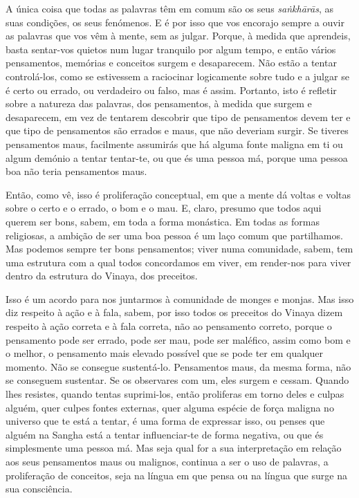 A única coisa que todas as palavras têm em comum são os seus \emph{saṅkhārās}, as suas
condições, os seus fenómenos. E é por isso que vos encorajo sempre a ouvir as
palavras que vos vêm à mente, sem as julgar. Porque, à medida que aprendeis,
basta sentar-vos quietos num lugar tranquilo por algum tempo, e então vários
pensamentos, memórias e conceitos surgem e desaparecem. Não estão a tentar
controlá-los, como se estivessem a raciocinar logicamente sobre tudo e a julgar
se é certo ou errado, ou verdadeiro ou falso, mas é assim. Portanto, isto é
refletir sobre a natureza das palavras, dos pensamentos, à medida que surgem e
desaparecem, em vez de tentarem descobrir que tipo de pensamentos devem ter e
que tipo de pensamentos são errados e maus, que não deveriam surgir. Se tiveres
pensamentos maus, facilmente assumirás que há alguma fonte maligna em ti ou
algum demónio a tentar tentar-te, ou que és uma pessoa má, porque uma pessoa
boa não teria pensamentos maus.

Então, como vê, isso é proliferação conceptual, em que a mente dá voltas e
voltas sobre o certo e o errado, o bom e o mau. E, claro, presumo que todos aqui
querem ser bons, sabem, em toda a forma monástica. Em todas as formas
religiosas, a ambição de ser uma boa pessoa é um laço comum que partilhamos. Mas
podemos sempre ter bons pensamentos; viver numa comunidade, sabem, tem uma
estrutura com a qual todos concordamos em viver, em render-nos para viver
dentro da estrutura do Vinaya, dos preceitos.

Isso é um acordo para nos juntarmos à comunidade de monges e monjas. Mas isso
diz respeito à ação e à fala, sabem, por isso todos os preceitos do Vinaya dizem
respeito à ação correta e à fala correta, não ao pensamento correto, porque o
pensamento pode ser errado, pode ser mau, pode ser maléfico, assim como bom e o
melhor, o pensamento mais elevado possível que se pode ter em qualquer momento.
Não se consegue sustentá-lo. Pensamentos maus, da mesma forma, não se conseguem
sustentar. Se os observares com um, eles surgem e cessam. Quando lhes resistes,
quando tentas suprimi-los, então proliferas em torno deles e culpas alguém,
quer culpes fontes externas, quer alguma espécie de força maligna no universo
que te está a tentar, é uma forma de expressar isso, ou penses que alguém na
Sangha está a tentar influenciar-te de forma negativa, ou que és simplesmente
uma pessoa má. Mas seja qual for a sua interpretação em relação aos seus
pensamentos maus ou malignos, continua a ser o uso de palavras, a proliferação
de conceitos, seja na língua em que pensa ou na língua que surge na sua
consciência.

